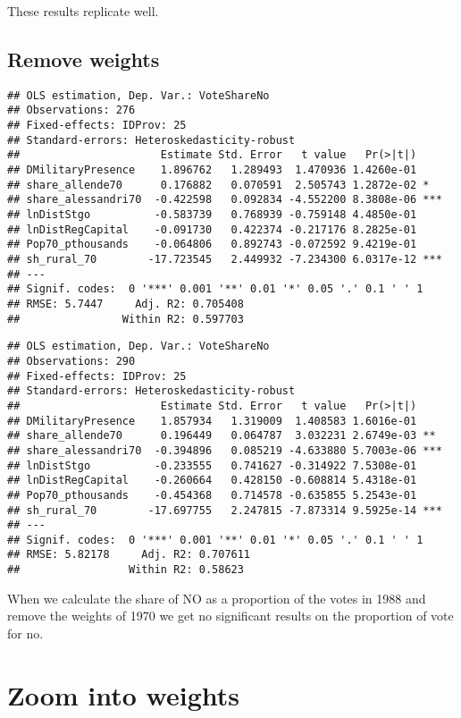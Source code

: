 \documentclass[
]{article}
\begin{document}
These results replicate well.

\hypertarget{remove-weights}{%
\subsection{Remove weights}\label{remove-weights}}

\begin{verbatim}
## OLS estimation, Dep. Var.: VoteShareNo
## Observations: 276 
## Fixed-effects: IDProv: 25
## Standard-errors: Heteroskedasticity-robust 
##                      Estimate Std. Error   t value   Pr(>|t|)    
## DMilitaryPresence    1.896762   1.289493  1.470936 1.4260e-01    
## share_allende70      0.176882   0.070591  2.505743 1.2872e-02 *  
## share_alessandri70  -0.422598   0.092834 -4.552200 8.3808e-06 ***
## lnDistStgo          -0.583739   0.768939 -0.759148 4.4850e-01    
## lnDistRegCapital    -0.091730   0.422374 -0.217176 8.2825e-01    
## Pop70_pthousands    -0.064806   0.892743 -0.072592 9.4219e-01    
## sh_rural_70        -17.723545   2.449932 -7.234300 6.0317e-12 ***
## ---
## Signif. codes:  0 '***' 0.001 '**' 0.01 '*' 0.05 '.' 0.1 ' ' 1
## RMSE: 5.7447     Adj. R2: 0.705408
##                Within R2: 0.597703
\end{verbatim}

\begin{verbatim}
## OLS estimation, Dep. Var.: VoteShareNo
## Observations: 290 
## Fixed-effects: IDProv: 25
## Standard-errors: Heteroskedasticity-robust 
##                      Estimate Std. Error   t value   Pr(>|t|)    
## DMilitaryPresence    1.857934   1.319009  1.408583 1.6016e-01    
## share_allende70      0.196449   0.064787  3.032231 2.6749e-03 ** 
## share_alessandri70  -0.394896   0.085219 -4.633880 5.7003e-06 ***
## lnDistStgo          -0.233555   0.741627 -0.314922 7.5308e-01    
## lnDistRegCapital    -0.260664   0.428150 -0.608814 5.4318e-01    
## Pop70_pthousands    -0.454368   0.714578 -0.635855 5.2543e-01    
## sh_rural_70        -17.697755   2.247815 -7.873314 9.5925e-14 ***
## ---
## Signif. codes:  0 '***' 0.001 '**' 0.01 '*' 0.05 '.' 0.1 ' ' 1
## RMSE: 5.82178     Adj. R2: 0.707611
##                 Within R2: 0.58623
\end{verbatim}

When we calculate the share of NO as a proportion of the votes in 1988
and remove the weights of 1970 we get no significant results on the
proportion of vote for no.

\hypertarget{zoom-into-weights}{%
\section{Zoom into weights}\label{zoom-into-weights}}
\end{document}
